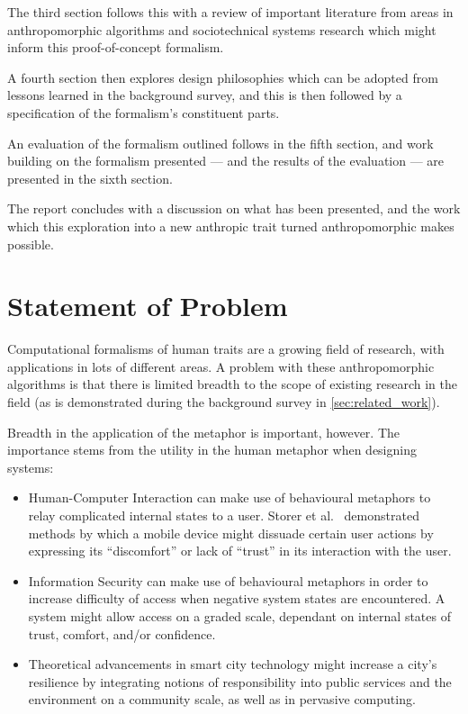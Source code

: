 The third section follows this with a review of important literature from areas in anthropomorphic algorithms and sociotechnical systems research which might inform this proof-of-concept formalism.\par

A fourth section then explores design philosophies which can be adopted from lessons learned in the background survey, and this is then followed by a specification of the formalism's constituent parts.\par

An evaluation of the formalism outlined follows in the fifth section, and work building on the formalism presented --- and the results of the evaluation --- are presented in the sixth section.\par

The report concludes with a discussion on what has been presented, and the work which this exploration into a new anthropic trait turned anthropomorphic makes possible.\par

\section{Statement of Problem}
Computational formalisms of human traits are a growing field of research, with applications in lots of different areas. A problem with these anthropomorphic algorithms is that there is limited breadth to the scope of existing research in the field (as is demonstrated during the background survey in \cref{sec:related_work}).\par

Breadth in the application of the metaphor is important, however. The importance stems from the utility in the human metaphor when designing systems:

\begin{itemize}
  \item Human-Computer Interaction can make use of behavioural metaphors to relay complicated internal states to a user. Storer et al.~\cite{storer_mobile_behaviour_poster} demonstrated methods by which a mobile device might dissuade certain user actions by expressing its ``discomfort'' or lack of ``trust'' in its interaction with the user.
  \item Information Security can make use of behavioural metaphors in order to increase difficulty of access when negative system states are encountered. A system might allow access on a graded scale, dependant on internal states of trust, comfort, and/or confidence.
  \item Theoretical advancements in smart city technology might increase a city's resilience by integrating notions of responsibility into public services and the environment on a community scale, as well as in pervasive computing\cite{wallis_talk_about_x_talk}.\par
\end{itemize}

